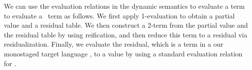We can use the evaluation relations in the dynamic semantics to
evaluate a term to evaluate a \lang\ term as follows. We first apply
1-evaluation to obtain a partial value and a residual table. We then
construct a 2-term from the partial value and the residual table by
using reification, and then reduce this term to a residual via
residualization.  Finally, we evaluate the residual, which is a term in a
our monostaged target language \langmono, to a value by using  a
standard evaluation relation for \langmono.







